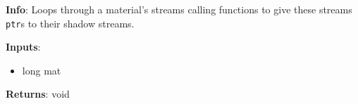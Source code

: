 \textbf{Info}: Loops through a material's streams calling functions to give
these streams \texttt{ptr}s to their shadow streams.  

\noindent \textbf{Inputs}:
\begin{itemize}
\item{long mat}
\end{itemize}

\noindent \textbf{Returns}: void

